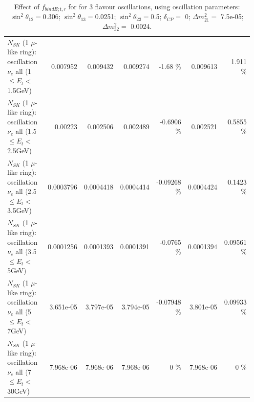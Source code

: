 \begin{table}
\begin{tabular}{| l | r | r | r  r | r  r |}
$N_{SK}$ (1 $\mu$-like ring): oscillation $\nu_{e}$ all (1 $\leq E_{t} <$ 1.5GeV) &        0.007952 &        0.009432 &        0.009274 &    -1.68 \%  &        0.009613 &    1.911 \%  \\ 
$N_{SK}$ (1 $\mu$-like ring): oscillation $\nu_{e}$ all (1.5 $\leq E_{t} <$ 2.5GeV) &         0.00223 &        0.002506 &        0.002489 &  -0.6906 \%  &        0.002521 &   0.5855 \%  \\ 
$N_{SK}$ (1 $\mu$-like ring): oscillation $\nu_{e}$ all (2.5 $\leq E_{t} <$ 3.5GeV) &       0.0003796 &       0.0004418 &       0.0004414 & -0.09268 \%  &       0.0004424 &   0.1423 \%  \\ 
$N_{SK}$ (1 $\mu$-like ring): oscillation $\nu_{e}$ all (3.5 $\leq E_{t} <$ 5GeV) &       0.0001256 &       0.0001393 &       0.0001391 &  -0.0765 \%  &       0.0001394 &  0.09561 \%  \\ 
 $N_{SK}$ (1 $\mu$-like ring): oscillation $\nu_{e}$ all (5 $\leq E_{t} <$ 7GeV) &       3.651e-05 &       3.797e-05 &       3.794e-05 & -0.07948 \%  &       3.801e-05 &  0.09933 \%  \\ 
$N_{SK}$ (1 $\mu$-like ring): oscillation $\nu_{e}$ all (7 $\leq E_{t} <$ 30GeV) &       7.968e-06 &       7.968e-06 &       7.968e-06 &        0 \%  &       7.968e-06 &        0 \%  \\ 
\hline
\hline
\end{tabular}
\caption{ Effect of $f_{bindE; t, r}$ for for 3 flavour oscillations, using oscillation parameters:  $\sin^2\theta_{12} = $0.306; $\sin^2\theta_{13} = $0.0251; $\sin^2\theta_{23} = $0.5; $\delta_{CP} = $        0; $\Delta m^2_{21} = $    7.5e-05; $\Delta m^2_{32} = $    0.0024. }
\label{tab:num_xsec_bindE_1RmuT_3f_osc_t13:0.0251}
\end{table}
\clearpage
